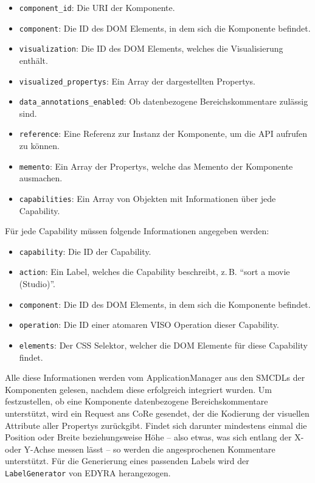 \documentclass[
	headsepline,
	footsepline,
	fontsize=12pt,
	bibliography=totoc
]{scrbook}
\begin{document}
\begin{itemize}
	\item \texttt{component\_id}: Die URI der Komponente.
	\item \texttt{component}: Die ID des DOM Elements, in dem sich die Komponente befindet.
	\item \texttt{visualization}: Die ID des DOM Elements, welches die Visualisierung enthält.
	\item \texttt{visualized\_propertys}: Ein Array der dargestellten Propertys.
	\item \texttt{data\_annotations\_enabled}: Ob datenbezogene Bereichskommentare zulässig sind.
	\item \texttt{reference}: Eine Referenz zur Instanz der Komponente, um die API aufrufen zu können.
	\item \texttt{memento}: Ein Array der Propertys, welche das Memento der Komponente ausmachen.
	\item \texttt{capabilities}: Ein Array von Objekten mit Informationen über jede Capability.
\end{itemize}

Für jede Capability müssen folgende Informationen angegeben werden:

\begin{itemize}
	\item \texttt{capability}: Die ID der Capability.
	\item \texttt{action}: Ein Label, welches die Capability beschreibt, z.\,B. \enquote{sort a movie (Studio)}.
	\item \texttt{component}: Die ID des DOM Elements, in dem sich die Komponente befindet.
	\item \texttt{operation}: Die ID einer atomaren VISO Operation dieser Capability.
	\item \texttt{elements}: Der CSS Selektor, welcher die DOM Elemente für diese Capability findet.
\end{itemize}

Alle diese Informationen werden vom ApplicationManager aus den SMCDLs der Komponenten gelesen, nachdem diese erfolgreich integriert wurden. Um festzustellen, ob eine Komponente datenbezogene Bereichskommentare unterstützt, wird ein Request ans CoRe gesendet, der die Kodierung der visuellen Attribute aller Propertys zurückgibt. Findet sich darunter mindestens einmal die Position oder Breite beziehungsweise Höhe -- also etwas, was sich entlang der X- oder Y-Achse messen lässt -- so werden die angesprochenen Kommentare unterstützt. Für die Generierung eines passenden Labels wird der \texttt{LabelGenerator} von EDYRA herangezogen.
\end{document}
